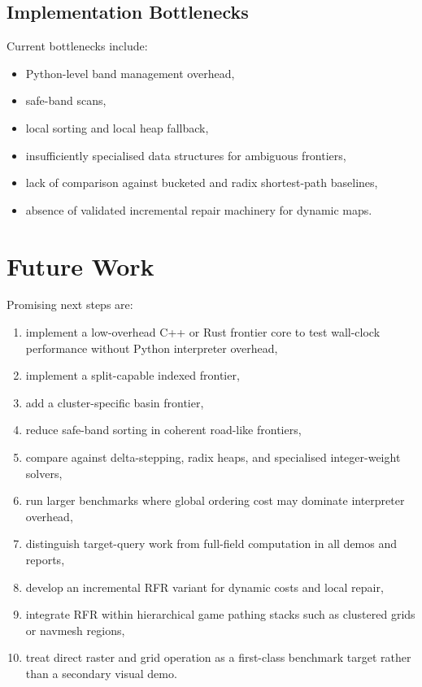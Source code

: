 \documentclass[11pt]{article}
\newcommand{\RFR}{\textsc{RFR}}
\begin{document}
\subsection{Implementation Bottlenecks}

Current bottlenecks include:

\begin{itemize}
  \item Python-level band management overhead,
  \item safe-band scans,
  \item local sorting and local heap fallback,
  \item insufficiently specialised data structures for ambiguous frontiers,
  \item lack of comparison against bucketed and radix shortest-path baselines,
  \item absence of validated incremental repair machinery for dynamic maps.
\end{itemize}

\section{Future Work}

Promising next steps are:

\begin{enumerate}
  \item implement a low-overhead C++ or Rust frontier core to test wall-clock performance without Python interpreter overhead,
  \item implement a split-capable indexed frontier,
  \item add a cluster-specific basin frontier,
  \item reduce safe-band sorting in coherent road-like frontiers,
  \item compare against delta-stepping, radix heaps, and specialised integer-weight solvers,
  \item run larger benchmarks where global ordering cost may dominate interpreter overhead,
  \item distinguish target-query work from full-field computation in all demos and reports,
  \item develop an incremental \RFR{} variant for dynamic costs and local repair,
  \item integrate \RFR{} within hierarchical game pathing stacks such as clustered grids or navmesh regions,
  \item treat direct raster and grid operation as a first-class benchmark target rather than a secondary visual demo.
\end{enumerate}
\end{document}
